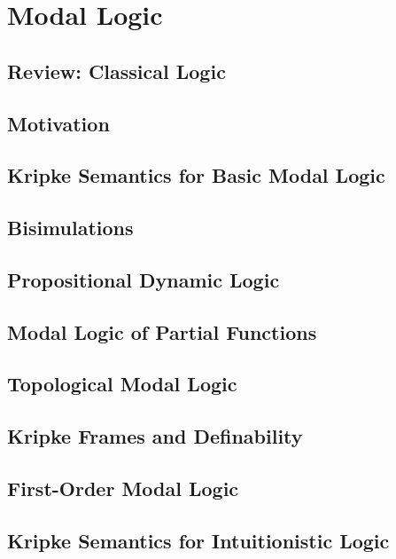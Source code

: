 \documentclass[11pt]{book}
\begin{document}
\chapter{Modal Logic}

\section*{Review: Classical Logic}

\section{Motivation}

\section{Kripke Semantics for Basic Modal Logic}

\section{Bisimulations}

\section{Propositional Dynamic Logic}

\section{Modal Logic of Partial Functions}

\section{Topological Modal Logic}

\section{Kripke Frames and Definability}

\section{First-Order Modal Logic}

\section{Kripke Semantics for Intuitionistic Logic}
\end{document}
